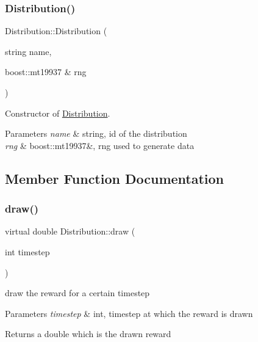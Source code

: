 \subsubsection{\texorpdfstring{Distribution()}{Distribution()}\hspace{0.1cm}{\footnotesize\ttfamily [2/2]}}
{\footnotesize\ttfamily Distribution\+::\+Distribution (\begin{DoxyParamCaption}\item[{string}]{name,  }\item[{boost\+::mt19937 \&}]{rng }\end{DoxyParamCaption})}



Constructor of \mbox{\hyperlink{class_distribution}{Distribution}}. 


\begin{DoxyParams}{Parameters}
{\em name} & string, id of the distribution \\
\hline
{\em rng} & boost\+::mt19937\&, rng used to generate data \\
\hline
\end{DoxyParams}


\subsection{Member Function Documentation}
\mbox{\label{class_distribution_a742b398af4a461243028cce3c47d8080}} 
\subsubsection{\texorpdfstring{draw()}{draw()}}
{\footnotesize\ttfamily virtual double Distribution\+::draw (\begin{DoxyParamCaption}\item[{int}]{timestep }\end{DoxyParamCaption})\hspace{0.3cm}{\ttfamily [pure virtual]}}



draw the reward for a certain timestep 


\begin{DoxyParams}{Parameters}
{\em timestep} & int, timestep at which the reward is drawn \\
\hline
\end{DoxyParams}
\begin{DoxyReturn}{Returns}
a double which is the drawn reward 
\end{DoxyReturn}


